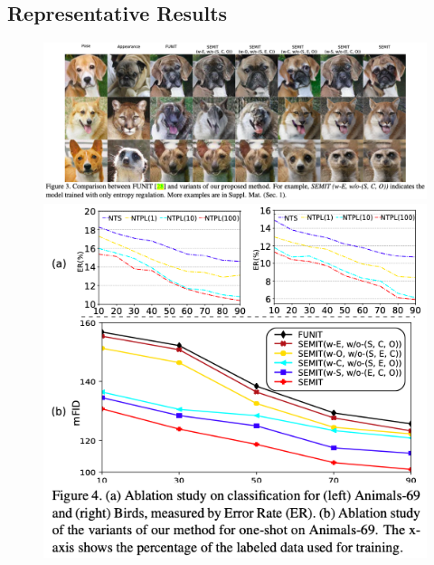 \documentclass[10pt]{article}
\begin{document}
            \subsection*{Representative Results}
                \begin{figure}
                    \includegraphics[width=\textwidth]{src/img/figure1.png} \\
                    \includegraphics[width=\textwidth]{src/img/figure2.png} \\
                \end{figure}
\end{document}
